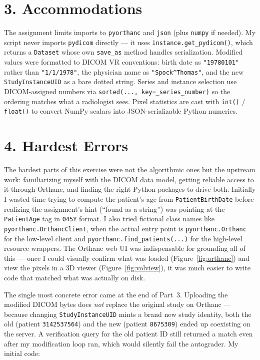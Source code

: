 \documentclass[11pt]{article}
\begin{document}
\section*{3. Accommodations}
The assignment limits imports to \texttt{pyorthanc} and \texttt{json} (plus \texttt{numpy} if needed). My script never imports \texttt{pydicom} directly --- it uses \texttt{instance.get\_pydicom()}, which returns a \texttt{Dataset} whose own \texttt{save\_as} method handles serialization. Modified values were formatted to DICOM VR conventions: birth date as \texttt{"19780101"} rather than \texttt{"1/1/1978"}, the physician name as \texttt{"Spock\^{}Thomas"}, and the new \texttt{StudyInstanceUID} as a bare dotted string. Series and instance selection use DICOM-assigned numbers via \texttt{sorted(..., key=\_series\_number)} so the ordering matches what a radiologist sees. Pixel statistics are cast with \texttt{int()} / \texttt{float()} to convert NumPy scalars into JSON-serializable Python numerics.

\section*{4. Hardest Errors}
The hardest parts of this exercise were not the algorithmic ones but the upstream work: familiarizing myself with the DICOM data model, getting reliable access to it through Orthanc, and finding the right Python packages to drive both. Initially I wasted time trying to compute the patient's age from \texttt{PatientBirthDate} before realizing the assignment's hint (``found as a string'') was pointing at the \texttt{PatientAge} tag in \texttt{045Y} format. I also tried fictional class names like \texttt{pyorthanc.OrthancClient}, when the actual entry point is \texttt{pyorthanc.Orthanc} for the low-level client and \texttt{pyorthanc.find\_patients(...)} for the high-level resource wrappers. The Orthanc web UI was indispensable for grounding all of this --- once I could visually confirm what was loaded (Figure~\ref{fig:orthanc}) and view the pixels in a 3D viewer (Figure~\ref{fig:volview}), it was much easier to write code that matched what was actually on disk.

The single most concrete error came at the end of Part~3. Uploading the modified DICOM bytes does \emph{not} replace the original study on Orthanc --- because changing \texttt{StudyInstanceUID} mints a brand new study identity, both the old (patient \texttt{3142537564}) and the new (patient \texttt{8675309}) ended up coexisting on the server. A verification query for the old patient ID still returned a match even after my modification loop ran, which would silently fail the autograder. My initial code:
\end{document}
